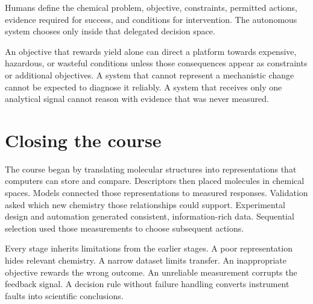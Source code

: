 Humans define the chemical problem, objective, constraints, permitted actions, evidence required for success, and conditions for intervention.
The autonomous system chooses only inside that delegated decision space.

An objective that rewards yield alone can direct a platform towards expensive, hazardous, or wasteful conditions unless those consequences appear as constraints or additional objectives.
A system that cannot represent a mechanistic change cannot be expected to diagnose it reliably.
A system that receives only one analytical signal cannot reason with evidence that was never measured.


\section{Closing the course}

The course began by translating molecular structures into representations that computers can store and compare.
Descriptors then placed molecules in chemical spaces.
Models connected those representations to measured responses.
Validation asked which new chemistry those relationships could support.
Experimental design and automation generated consistent, information-rich data.
Sequential selection used those measurements to choose subsequent actions.


Every stage inherits limitations from the earlier stages.
A poor representation hides relevant chemistry.
A narrow dataset limits transfer.
An inappropriate objective rewards the wrong outcome.
An unreliable measurement corrupts the feedback signal.
A decision rule without failure handling converts instrument faults into scientific conclusions.

